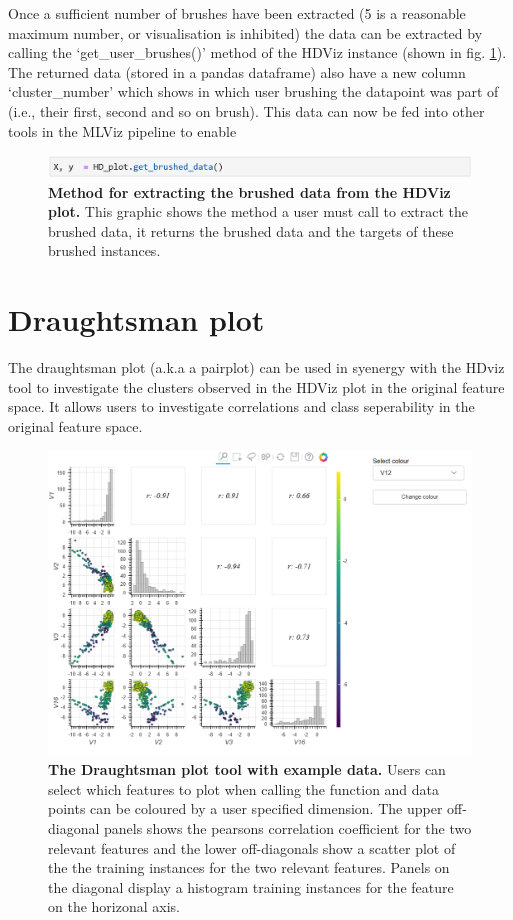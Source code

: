 \documentclass[11pt]{article} %
\begin{document}
Once a sufficient number of brushes have been extracted (5 is a reasonable maximum number, or visualisation is inhibited) the data can be extracted by calling the `get\_user\_brushes()' method of the HDViz instance (shown in fig. \ref{fig:get_data_method}). The returned data (stored in a pandas dataframe) also have a new column `cluster\_number' which shows in which user brushing the datapoint was part of (i.e., their first, second and so on brush). This data can now be fed into other tools in the MLViz pipeline to enable

\begin{figure}
\includegraphics[width=5.75in]{images/get_brushed_data_command.png}
\caption{\textbf{Method for extracting the brushed data from the HDViz plot.} This graphic shows the method a user must call to extract the brushed data, it returns the brushed data and the targets of these brushed instances.}
\label{fig:get_data_method}
\end{figure}

\section{Draughtsman plot}

The draughtsman plot (a.k.a a pairplot) can be used in syenergy with the HDviz tool to investigate the clusters observed in the HDViz plot in the original feature space. It allows users to investigate correlations and class seperability in the original feature space.


\begin{figure}
\centering
\includegraphics[width=5.75in]{images/draughtplot.png}
\caption{\textbf{The Draughtsman plot tool with example data.} Users can select which features to plot when calling the function and data points can be coloured by a user specified dimension. The upper off-diagonal panels shows the pearsons correlation coefficient for the two relevant features and the lower off-diagonals show a scatter plot of the the training instances for the two relevant features. Panels on the diagonal display a histogram training instances for the feature on the horizonal axis.}
\end{figure}
\end{document}

